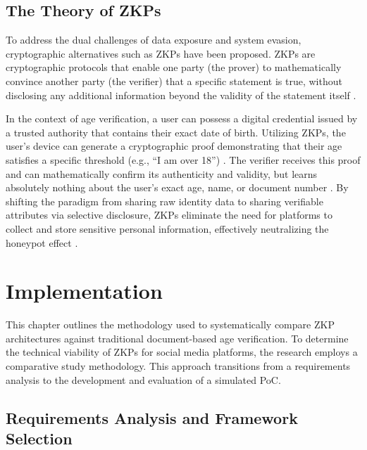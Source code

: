 \documentclass [english]{hogent-article}
\begin{document}
    
    
    \subsection{The Theory of ZKPs}
    
    To address the dual challenges of data exposure and system evasion, cryptographic alternatives such as ZKPs have been proposed. ZKPs are cryptographic protocols that enable one party (the prover) to mathematically convince another party (the verifier) that a specific statement is true, without disclosing any additional information beyond the validity of the statement itself \autocite{Bootsma2025, EUCommission2025}. 
    
    
    
    In the context of age verification, a user can possess a digital credential issued by a trusted authority that contains their exact date of birth. Utilizing ZKPs, the user's device can generate a cryptographic proof demonstrating that their age satisfies a specific threshold (e.g., ``I am over 18'') \autocite{Bootsma2025, Wodo2025}. The verifier receives this proof and can mathematically confirm its authenticity and validity, but learns absolutely nothing about the user's exact age, name, or document number \autocite{EUCommission2025, Kesim2025}. By shifting the paradigm from sharing raw identity data to sharing verifiable attributes via selective disclosure, ZKPs eliminate the need for platforms to collect and store sensitive personal information, effectively neutralizing the honeypot effect \autocite{Bootsma2025}.
    
    
    
    
    
    \section{Implementation}%
    
    \label{sec:implementation}
    
    This chapter outlines the methodology used to systematically compare ZKP architectures against traditional document-based age verification. To determine the technical viability of ZKPs for social media platforms, the research employs a comparative study methodology. This approach transitions from a requirements analysis to the development and evaluation of a simulated PoC.
    
    
    
    \subsection{Requirements Analysis and Framework Selection}
    
\end{document}
